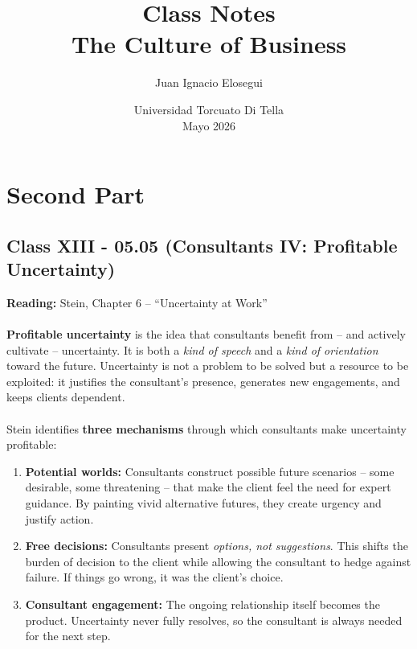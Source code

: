\documentclass[a4paper,12pt]{article}
\title{\vspace{-2cm}\textbf{Class Notes}\\[0.2cm]
\large The Culture of Business}
\author{Juan Ignacio Elosegui}
\date{Universidad Torcuato Di Tella \\ Mayo 2026}
\begin{document}
\maketitle
\section*{Second Part}
\subsection*{Class XIII - 05.05 (Consultants IV: Profitable Uncertainty)}
\noindent \textbf{Reading:} Stein, Chapter 6 -- ``Uncertainty at Work'' \\
\\
\noindent \textbf{Profitable uncertainty} is the idea that consultants benefit from -- and actively cultivate -- uncertainty. It is both a \emph{kind of speech} and a \emph{kind of orientation} toward the future. Uncertainty is not a problem to be solved but a resource to be exploited: it justifies the consultant's presence, generates new engagements, and keeps clients dependent. \\
\\
\noindent Stein identifies \textbf{three mechanisms} through which consultants make uncertainty profitable:
\begin{enumerate}
	\item \textbf{Potential worlds:} Consultants construct possible future scenarios -- some desirable, some threatening -- that make the client feel the need for expert guidance. By painting vivid alternative futures, they create urgency and justify action.
	\item \textbf{Free decisions:} Consultants present \emph{options, not suggestions}. This shifts the burden of decision to the client while allowing the consultant to hedge against failure. If things go wrong, it was the client's choice.
	\item \textbf{Consultant engagement:} The ongoing relationship itself becomes the product. Uncertainty never fully resolves, so the consultant is always needed for the next step.
\end{enumerate}
\end{document}
